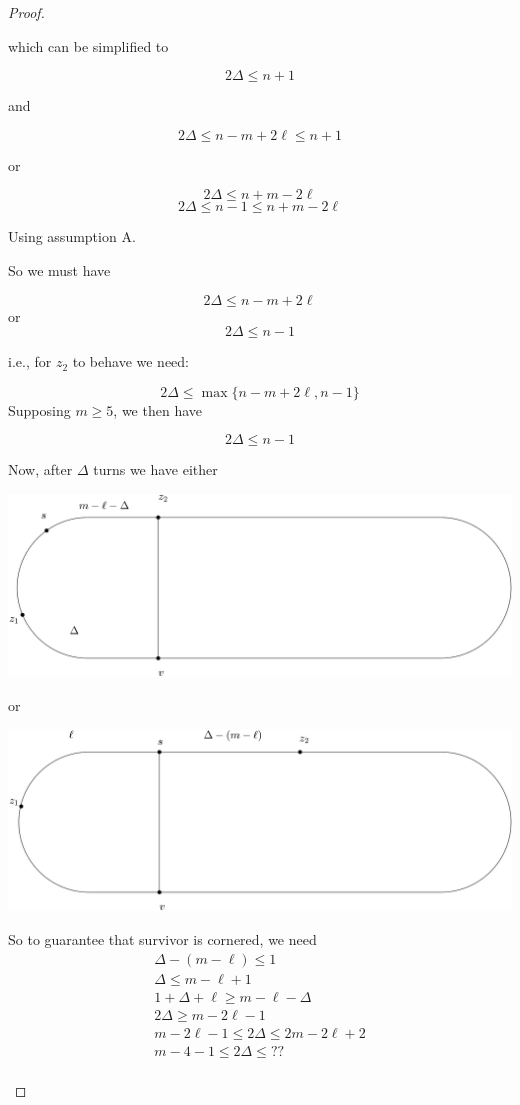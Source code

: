 \documentclass[letterpaper, 10pt]{article}
\begin{document}
\begin{proof}
\begin{proofpart}
which can be simplified to

\[ 2 \Delta \leq n+1 \]
\begin{center}and\end{center}
\[ 2 \Delta \leq n - m + 2\ell \leq n+1 \]

or

\[ 2 \Delta \leq n+m -2 \ell \]
\[ 2 \Delta \leq n -1 \leq n + m - 2\ell \]

Using assumption A.

So we must have

\[ 2 \Delta \leq n - m +2 \ell \]
or
\[ 2 \Delta \leq  n -1 \]

i.e., for $z_2$ to behave we need:

\[ 2 \Delta \leq \max \{ n - m +2\ell, n -1 \} \]
Supposing $m \geq 5$, we then have

\[ 2 \Delta \leq n-1 \]

Now, after $\Delta$ turns we have either
\begin{center}
 \includegraphics[scale=0.20]{diagram2}
\end{center}
or
\begin{center}
 \includegraphics[scale=0.20]{diagram3}
\end{center}

So to guarantee that survivor is cornered, we need
\begin{align*}
  \Delta - (m- \ell) \leq 1 \\
  \Delta \leq m - \ell + 1 \\
  1 + \Delta + \ell \geq m - \ell - \Delta \\
  2 \Delta \geq m - 2\ell  -1 \\
  m - 2\ell -1 \leq 2 \Delta \leq 2m - 2\ell +2 \\
  m - 4 - 1 \leq 2 \Delta \leq ?? \\
\end{align*}



\end{proofpart}

\end{proof}
\end{document}
